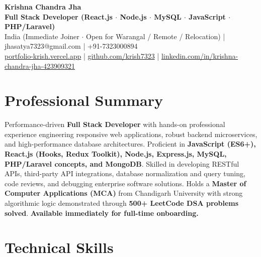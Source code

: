 \documentclass[a4paper,10pt]{article}
\begin{document}
\begin{center}

    {\LARGE \textbf{Krishna Chandra Jha}} \\[2.5pt]

    \textbf{Full Stack Developer (React.js $\cdot$ Node.js $\cdot$ MySQL $\cdot$ JavaScript $\cdot$ PHP/Laravel)} \\[3.5pt]

    India (Immediate Joiner $\cdot$ Open for Warangal / Remote / Relocation)
    \quad | \quad
    jhasatya7323@gmail.com
    \quad | \quad
    +91-7323000894
    \\[2.5pt]

    \href{https://portfolio-ashen-alpha-dv0whhsamo.vercel.app/}{portfolio-krish.vercel.app}
    \quad | \quad
    \href{https://github.com/krish7323}{github.com/krish7323}
    \quad | \quad
    \href{https://linkedin.com/in/krishna-chandra-jha-423909321}
    {linkedin.com/in/krishna-chandra-jha-423909321}

\end{center}

\section*{Professional Summary}

Performance-driven \textbf{Full Stack Developer} with hands-on professional experience engineering responsive web applications, robust backend microservices, and high-performance database architectures. Proficient in \textbf{JavaScript (ES6+), React.js (Hooks, Redux Toolkit), Node.js, Express.js, MySQL, PHP/Laravel concepts, and MongoDB}. Skilled in developing RESTful APIs, third-party API integrations, database normalization and query tuning, code reviews, and debugging enterprise software solutions. Holds a \textbf{Master of Computer Applications (MCA)} from Chandigarh University with strong algorithmic logic demonstrated through \textbf{500+ LeetCode DSA problems solved}. \textbf{Available immediately for full-time onboarding.}

\section*{Technical Skills}
\end{document}
